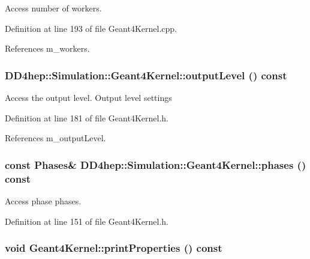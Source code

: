 Access number of workers. 

Definition at line 193 of file Geant4Kernel.cpp.

References m\_\-workers.\hypertarget{class_d_d4hep_1_1_simulation_1_1_geant4_kernel_a36af85f213b7ded85d93621bdeacf09c}{
\subsubsection[{outputLevel}]{ DD4hep::Simulation::Geant4Kernel::outputLevel () const}}
\label{class_d_d4hep_1_1_simulation_1_1_geant4_kernel_a36af85f213b7ded85d93621bdeacf09c}


Access the output level. Output level settings 

Definition at line 181 of file Geant4Kernel.h.

References m\_\-outputLevel.\hypertarget{class_d_d4hep_1_1_simulation_1_1_geant4_kernel_abebf51658a09e2e47dda6cd46e803ee0}{
\subsubsection[{phases}]{\setlength{\rightskip}{0pt plus 5cm}const {\bf Phases}\& DD4hep::Simulation::Geant4Kernel::phases () const}}
\label{class_d_d4hep_1_1_simulation_1_1_geant4_kernel_abebf51658a09e2e47dda6cd46e803ee0}


Access phase phases. 

Definition at line 151 of file Geant4Kernel.h.\hypertarget{class_d_d4hep_1_1_simulation_1_1_geant4_kernel_a2a2e31125a2bf5f5a40dd132f00d35d1}{
\subsubsection[{printProperties}]{\setlength{\rightskip}{0pt plus 5cm}void Geant4Kernel::printProperties () const}}
\label{class_d_d4hep_1_1_simulation_1_1_geant4_kernel_a2a2e31125a2bf5f5a40dd132f00d35d1}


